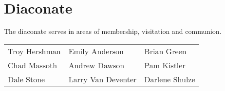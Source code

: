 \vspace{\fill}

\section{Diaconate}
\label{diaconate}

The diaconate serves in areas of membership, visitation and communion.

\begin{tabular}{@{}lll}
Troy Hershman & Emily Anderson & Brian Green \\ %
Chad Massoth & Andrew Dawson & Pam Kistler \\%
Dale Stone & Larry Van Deventer & Darlene Shulze \\%
\end{tabular}
 

\vspace{\fill}
